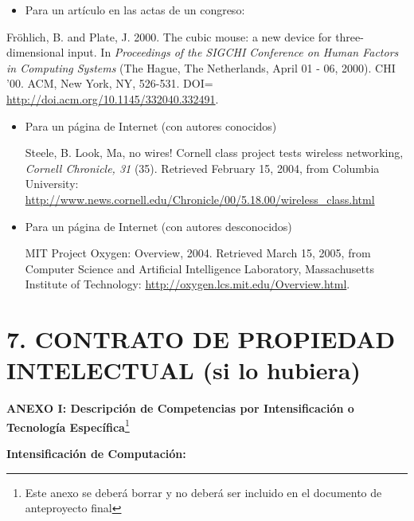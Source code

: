 \documentclass[a4paper]{article}
\newcommand\textstyleStrongEmphasis[1]{\textbf{#1}}
\newcommand\liststyleLv{%
\renewcommand\labelitemi{{\textbullet}}
\renewcommand\labelitemii{${\circ}$}
\renewcommand\labelitemiii{${\blacksquare}$}
\renewcommand\labelitemiv{{\textbullet}}
}
\newcommand\liststyleLvi{%
\renewcommand\labelitemi{{\textbullet}}
\renewcommand\labelitemii{${\circ}$}
\renewcommand\labelitemiii{${\blacksquare}$}
\renewcommand\labelitemiv{{\textbullet}}
}
\begin{document}
\liststyleLv
\begin{itemize}
\item Para un art\'iculo en las actas de un congreso:
\end{itemize}
Fr\"ohlich, B. and Plate, J. 2000. The cubic mouse: a new device for three-dimensional input. In \textit{Proceedings of
the SIGCHI Conference on Human Factors in Computing Systems} (The Hague, The Netherlands, April 01 - 06, 2000). CHI
'00. ACM, New York, NY, 526-531. DOI= \url{http://doi.acm.org/10.1145/332040.332491}.

\liststyleLvi
\begin{itemize}
\item Para un p\'agina de Internet (con autores conocidos)

Steele, B. Look, Ma, no wires! Cornell class project tests wireless networking, \textit{Cornell Chronicle, 31 }(35).
Retrieved February 15, 2004, from Columbia University:
\url{http://www.news.cornell.edu/Chronicle/00/5.18.00/wireless_class.html}
\item Para un p\'agina de Internet (con autores desconocidos)

MIT Project Oxygen: Overview, 2004. Retrieved March 15, 2005, from Computer Science and Artificial Intelligence
Laboratory, Massachusetts Institute of Technology: \url{http://oxygen.lcs.mit.edu/Overview.html}. \
\end{itemize}

\bigskip

\section{7. CONTRATO DE PROPIEDAD INTELECTUAL (si lo hubiera)}

\bigskip

\clearpage\clearpage\pagestyle{plain}
\thispagestyle{FirstPage}
{\centering
\textstyleStrongEmphasis{ANEXO I: Descripci\'on de Competencias por Intensificaci\'on o Tecnolog\'ia
Espec\'ifica}\footnote{Este anexo se deber\'a borrar y no deber\'a ser incluido en el documento de anteproyecto final}
\par}

{\bfseries
Intensificaci\'on de Computaci\'on:}
\end{document}
